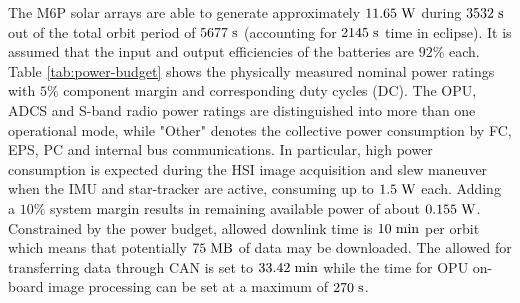 The M6P solar arrays are able to generate approximately $11.65 \hspace{3pt} \rm{W}$ during $3532 \hspace{3pt} \rm{s}$ out of the total orbit period of $5677 \hspace{3pt} \rm{s}$ (accounting for $2145 \hspace{3pt} \rm{s}$ time in eclipse). It is assumed that the input and output efficiencies of the batteries are $92 \%$ each. Table \ref{tab:power-budget} shows the physically measured nominal power ratings with $5 \%$ component margin and corresponding duty cycles (DC). The OPU, ADCS and S-band radio power ratings are distinguished into more than one operational mode, while "Other" denotes the collective power consumption by FC, EPS, PC and internal bus communications. In particular, high power consumption is expected during the HSI image acquisition and slew maneuver when the IMU and star-tracker are active, consuming up to $1.5 \hspace{3pt} \rm{W}$ each. Adding a $10 \%$ system margin results in remaining available power of about $0.155 \hspace{3pt} \rm{W}$. Constrained by the power budget, allowed downlink time is $10 \hspace{3pt} \rm{min}$ per orbit which means that potentially $75 \hspace{3pt} \rm{MB}$ of data may be downloaded. The allowed for transferring data through CAN is set to $33.42 \hspace{3pt} \rm{min}$ while the time for OPU on-board image processing can be set at a maximum of $270 \hspace{3pt} \rm{s}$.

